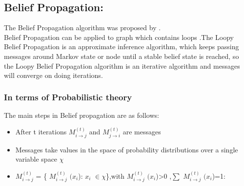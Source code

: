 \documentclass{singlecol-new}
\theoremstyle{TH}{
\newtheorem{lemma}{Lemma}
\newtheorem{theorem}[lemma]{Theorem}
\newtheorem{corrolary}[lemma]{Corrolary}
\newtheorem{conjecture}[lemma]{Conjecture}
\newtheorem{proposition}[lemma]{Proposition}
\newtheorem{claim}[lemma]{Claim}
\newtheorem{stheorem}[lemma]{Wrong Theorem}
\newtheorem{algorithm}{Algorithm}
}
\theoremstyle{THrm}{
\newtheorem{definition}{Definition}[section]
\newtheorem{question}{Question}[section]
\newtheorem{remark}{Remark}
\newtheorem{scheme}{Scheme}
}
\theoremstyle{THhit}{
\newtheorem{case}{Case}[section]
}
\begin{document}
\subsection{Belief Propagation:}
The Belief Propagation algorithm was proposed by  \cite{pearl}.\\ Belief Propagation can be applied to graph which contains loops .The Loopy Belief Propagation is an approximate inference algorithm, which keeps passing messages around Markov state or node until a stable belief state is reached, so the Loopy Belief Propagation algorithm is an iterative algorithm and messages will converge on doing iterations.
























\subsubsection{In terms of Probabilistic theory}
The main steps in Belief propagation are as follows:
















\begin{itemize}
\item {After t iterations  $M^{(t)}_{i\rightarrow j}$ and $M ^{(t)}_{j\rightarrow i}$ are messages }
  \item {Messages take values in the space of probability distributions over a single variable space $\chi $}








  \item {$M^{(t)}_{i\rightarrow j}$ = \{ $M^{(t)}_{i\rightarrow j}$ $(x_{i}$): $x_{i}$ $\in$$\chi$\},with $M^{(t)}_{i\rightarrow j}$ $(x_{i}$)>0 ,$ \sum$ $M^{(t)}_{i\rightarrow j}$ $(x_{i}$)=1: }
\end{itemize}
\end{document}

